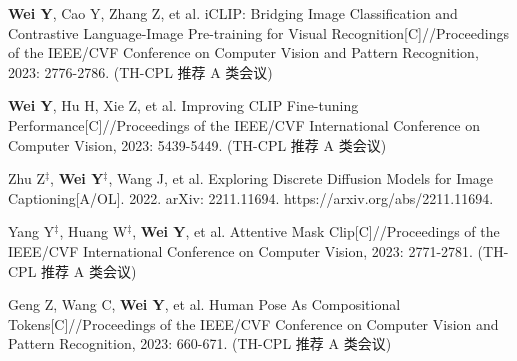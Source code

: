 \begin{resume}
  \begin{achievements}
      \item \textbf{Wei Y}, Cao Y, Zhang Z, et al. iCLIP: Bridging Image Classification and Contrastive Language-Image Pre-training for Visual Recognition[C]//Proceedings of the IEEE/CVF Conference on Computer Vision and Pattern Recognition, 2023: 2776-2786. (TH-CPL 推荐 A 类会议)
    \item \textbf{Wei Y}, Hu H, Xie Z, et al. Improving CLIP Fine-tuning Performance[C]//Proceedings of the IEEE/CVF International Conference on Computer Vision, 2023: 5439-5449. (TH-CPL 推荐 A 类会议)
    \item Zhu Z$^\ddag$, \textbf{Wei Y}$^\ddag$, Wang J, et al. Exploring Discrete Diffusion Models for Image Captioning[A/OL]. 2022. arXiv: 2211.11694. https://arxiv.org/abs/2211.11694.
    \item Yang Y$^\ddag$, Huang W$^\ddag$, \textbf{Wei Y}, et al. Attentive Mask Clip[C]//Proceedings of the IEEE/CVF International Conference on Computer Vision, 2023: 2771-2781. (TH-CPL 推荐 A 类会议)
    \item Geng Z, Wang C, \textbf{Wei Y}, et al. Human Pose As Compositional Tokens[C]//Proceedings of the IEEE/CVF Conference on Computer Vision and Pattern Recognition, 2023: 660-671. (TH-CPL 推荐 A 类会议)

\end{achievements}
\end{resume}
